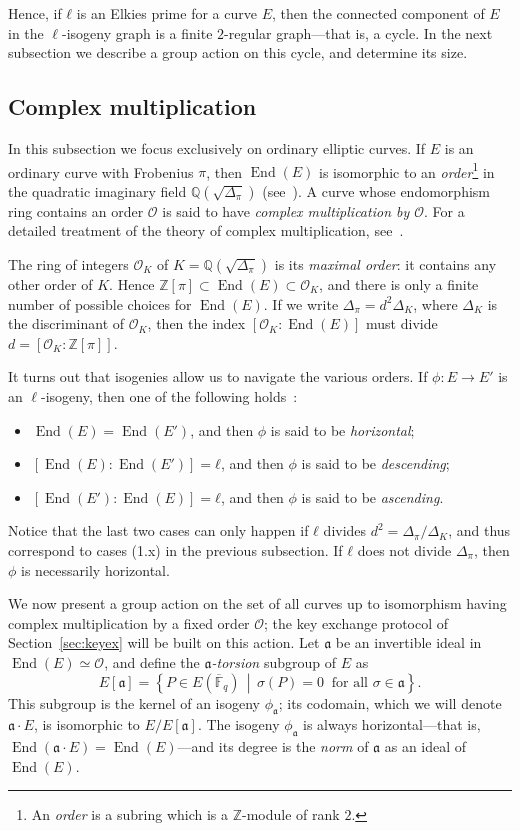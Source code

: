 \documentclass{llncs}
\newcommand{\Fbar}{\overline{\mathbb{F}}}
\renewcommand{\O}{\mathcal{O}}
\newcommand{\set}[1]{\left\{#1\right\}}
\newcommand{\suchthat}{\,\middle\vert\,}
\renewcommand{\frak}{\mathfrak}
\DeclareMathOperator{\End}{End}
\begin{document}
Hence, if $ℓ$ is an Elkies prime for a curve $E$,
then the connected component of $E$ in the $\ell$-isogeny graph 
is a finite $2$-regular graph---that is, a cycle. 
In the next subsection we describe a group action on this cycle,
and determine its size.


\subsection{Complex multiplication}

In this subsection we focus exclusively on ordinary elliptic curves. 
If $E$ is an ordinary curve with Frobenius $π$,
then $\End(E)$ is isomorphic to an
\emph{order}\footnote{%
    An \emph{order} is a subring which is a $ℤ$-module of rank $2$.
} in the quadratic imaginary field
$ℚ(\sqrt{Δ_π})$ (see~\cite[III.9]{silverman:elliptic}).
A curve whose endomorphism ring contains an order $\O$ is said to
have \emph{complex multiplication by $\O$}.
For a detailed treatment of the theory of complex multiplication,
see~\cite{lang1987elliptic,silverman:advanced}.

The ring of integers $\O_K$ of $K=ℚ(\sqrt{Δ_π})$ is its
\emph{maximal order}: it contains any other order of $K$.  Hence
$ℤ[π]⊂\End(E)⊂\O_K$, and there is only a finite number of possible
choices for $\End(E)$. If we write $Δ_π=d^2Δ_K$, where $Δ_K$ is the
discriminant of $\O_K$, then the index $[\O_K:\End(E)]$ must divide
$d=[\O_K:ℤ[π]]$.

It turns out that isogenies allow us to navigate the various
orders. If $ϕ:E→E'$ is an $\ell$-isogeny, then one of the following
holds~\cite[Prop.~21]{kohel}:
\begin{itemize}
\item $\End(E) = \End(E')$, and then $ϕ$ is said to be
  \emph{horizontal};
\item $[\End(E):\End(E')] = ℓ$, and then $ϕ$ is said to be
  \emph{descending};
\item $[\End(E'):\End(E)] = ℓ$, and then $ϕ$ is said to be
  \emph{ascending}.
\end{itemize}
Notice that the last two cases can only happen if $ℓ$ divides
$d^2=Δ_π/Δ_K$, and thus correspond to cases (1.x) in the previous
subsection.
If $ℓ$ does not divide $Δ_π$, then $ϕ$ is necessarily horizontal.

We now present a group action on the set of all curves 
up to isomorphism having complex
multiplication by a fixed order $\O$; the key exchange protocol of
Section~\ref{sec:keyex} will be built on this action. Let $\frak a$ be
an invertible ideal in $\End(E)≃\O$, and define the
\emph{${\frak a}$-torsion} subgroup of $E$ as
\[
E[\frak a] = \set{P\in E(\Fbar_q) \suchthat σ(P) = 0\ 
\text{ for all }σ\in\frak a}.
\]
This subgroup is the kernel of an isogeny $\phi_{\frak a}$;
its codomain, which we will denote $\frak a\cdot E$,
is isomorphic to $E/E[\frak a]$.  
The isogeny $\phi_{\frak a}$ is
always horizontal---that is, $\End(\frak a \cdot E) = \End(E)$---and its
degree is the \emph{norm} of $\frak a$ as an ideal of $\End(E)$.
\end{document}
